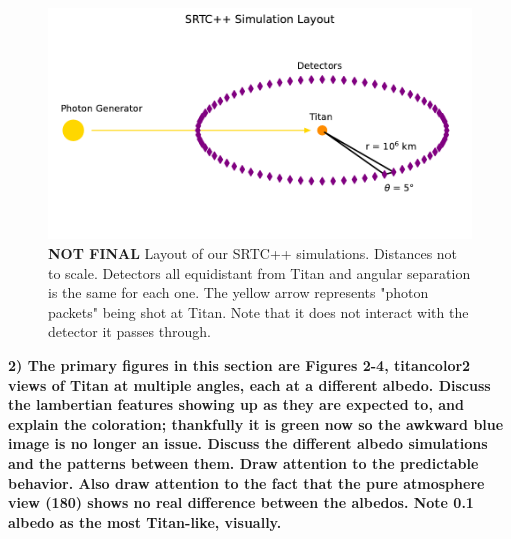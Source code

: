 \documentclass[twocolumn,linenumbers]{aastex631}
\begin{document}
\begin{figure}[htbp]
\includegraphics[scale = 0.5]{SRTCLayout.pdf}
\centering
\caption{\textbf{\color{red}NOT FINAL\color{black}} Layout of our SRTC++ simulations. Distances not to scale. Detectors all equidistant from Titan and angular separation is the same for each one. The yellow arrow represents "photon packets" being shot at Titan. Note that it does not interact with the detector it passes through.}
\label{fig:1}
\end{figure}

\textbf{\color{blue}2) The primary figures in this section are Figures 2-4, titancolor2 views of Titan at multiple angles, each at a different albedo. Discuss the lambertian features showing up as they are expected to, and explain the coloration; thankfully it is green now so the awkward blue image is no longer an issue. Discuss the different albedo simulations and the patterns between them. Draw attention to the predictable behavior. Also draw attention to the fact that the pure atmosphere view (180) shows no real difference between the albedos. Note 0.1 albedo as the most Titan-like, visually.\color{black}}
\end{document}
